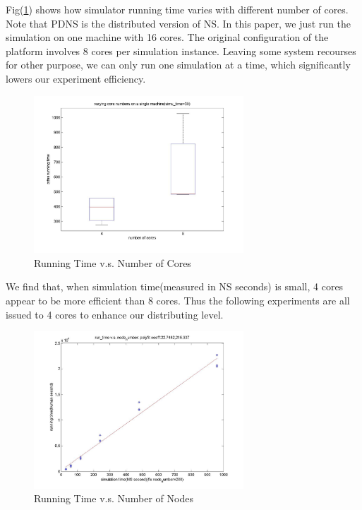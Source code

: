 \documentclass[11pt,a4paper]{article}
\begin{document}
Fig(\ref{fig:simu_bm_rt_core}) shows how simulator running time 
varies with different number of cores. Note that PDNS \cite{pdns}
is the distributed version of NS\cite{ns}. In this paper, we 
just run the simulation on one machine with 16 cores. The original 
configuration of the platform involves 8 cores per simulation instance. 
Leaving some system recourses for other purpose, we can only 
run one simulation at a time, which significantly lowers our 
experiment efficiency. 

\begin{figure}[htb]
\centering
	\includegraphics[width=0.7\textwidth]{../fig/runtime_vs_core.jpg}
	\caption{Running Time v.s. Number of Cores}
	\label{fig:simu_bm_rt_core}
\end{figure}

We find that, when simulation time(measured in NS seconds) is small, 
4 cores appear to be more efficient than 8 cores. Thus the following 
experiments are all issued to 4 cores to enhance our distributing level. 


\begin{figure}[htb]
\centering
	\includegraphics[width=0.7\textwidth]{../fig/runtime_vs_nodenum.jpg}
	\caption{Running Time v.s. Number of Nodes}
	\label{fig:simu_bm_rt_node}
\end{figure}
\end{document}
